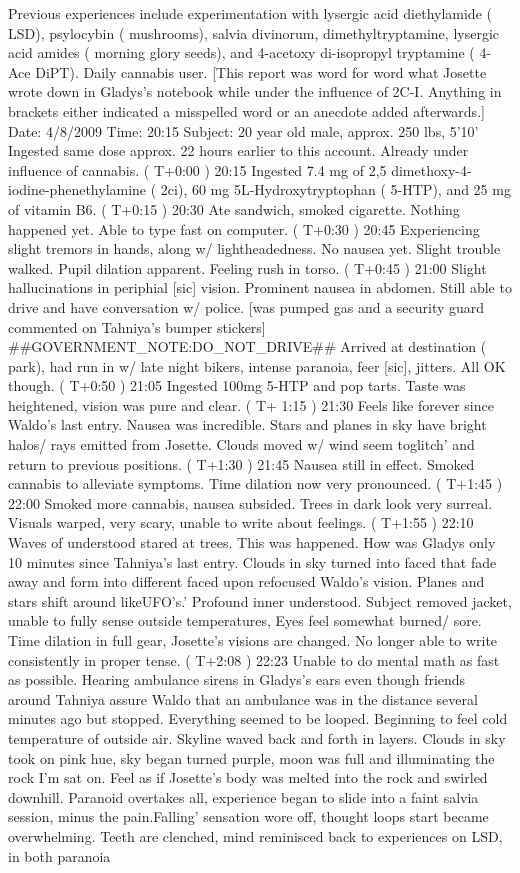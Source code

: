 \documentclass[12pt]{book}
\begin{document}
Previous experiences include experimentation with lysergic acid diethylamide ( LSD), psylocybin ( mushrooms), salvia divinorum, dimethyltryptamine, lysergic acid amides ( morning glory seeds), and 4-acetoxy di-isopropyl tryptamine ( 4-Ace DiPT). Daily cannabis user. [This report was word for word what Josette wrote down in Gladys's notebook while under the influence of 2C-I. Anything in brackets either indicated a misspelled word or an anecdote added afterwards.] Date: 4/8/2009 Time: 20:15 Subject: 20 year old male, approx. 250 lbs, 5'10' Ingested same dose approx. 22 hours earlier to this account. Already under influence of cannabis. ( T+0:00 ) 20:15 Ingested 7.4 mg of 2,5 dimethoxy-4-iodine-phenethylamine ( 2ci), 60 mg 5L-Hydroxytryptophan ( 5-HTP), and 25 mg of vitamin B6. ( T+0:15 ) 20:30 Ate sandwich, smoked cigarette. Nothing happened yet. Able to type fast on computer. ( T+0:30 ) 20:45 Experiencing slight tremors in hands, along w/ lightheadedness. No nausea yet. Slight trouble walked. Pupil dilation apparent. Feeling rush in torso. ( T+0:45 ) 21:00 Slight hallucinations in periphial [sic] vision. Prominent nausea in abdomen. Still able to drive and have conversation w/ police. [was pumped gas and a security guard commented on Tahniya's bumper stickers] \#\#GOVERNMENT\_NOTE:DO\_NOT\_DRIVE\#\# Arrived at destination ( park), had run in w/ late night bikers, intense paranoia, feer [sic], jitters. All OK though. ( T+0:50 ) 21:05 Ingested 100mg 5-HTP and pop tarts. Taste was heightened, vision was pure and clear. ( T+ 1:15 ) 21:30 Feels like forever since Waldo's last entry. Nausea was incredible. Stars and planes in sky have bright halos/ rays emitted from Josette. Clouds moved w/ wind seem toglitch' and return to previous positions. ( T+1:30 ) 21:45 Nausea still in effect. Smoked cannabis to alleviate symptoms. Time dilation now very pronounced. ( T+1:45 ) 22:00 Smoked more cannabis, nausea subsided. Trees in dark look very surreal. Visuals warped, very scary, unable to write about feelings. ( T+1:55 ) 22:10 Waves of understood stared at trees. This was happened. How was Gladys only 10 minutes since Tahniya's last entry. Clouds in sky turned into faced that fade away and form into different faced upon refocused Waldo's vision. Planes and stars shift around likeUFO's.' Profound inner understood. Subject removed jacket, unable to fully sense outside temperatures, Eyes feel somewhat burned/ sore. Time dilation in full gear, Josette's visions are changed. No longer able to write consistently in proper tense. ( T+2:08 ) 22:23 Unable to do mental math as fast as possible. Hearing ambulance sirens in Gladys's ears even though friends around Tahniya assure Waldo that an ambulance was in the distance several minutes ago but stopped. Everything seemed to be looped. Beginning to feel cold temperature of outside air. Skyline waved back and forth in layers. Clouds in sky took on pink hue, sky began turned purple, moon was full and illuminating the rock I'm sat on. Feel as if Josette's body was melted into the rock and swirled downhill. Paranoid overtakes all, experience began to slide into a faint salvia session, minus the pain.Falling' sensation wore off, thought loops start became overwhelming. Teeth are clenched, mind reminisced back to experiences on LSD, in both paranoia 
\end{document}
